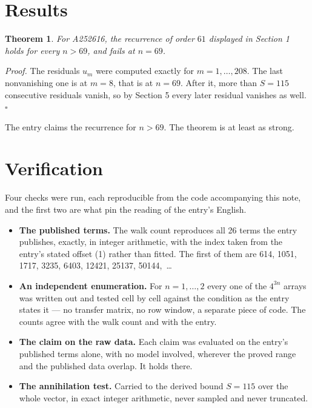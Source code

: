 \documentclass[11pt]{article}
\newtheorem{theorem}{Theorem}
\theoremstyle{definition}
\begin{document}
\section{Results}

\begin{theorem} For A252616, the recurrence of order $61$ displayed in Section 1 holds for every $n > 69$, and fails at $n = 69$.\end{theorem}

{\itshape Proof.} The residuals $u_m$ were computed exactly for $m = 1,\dots,208$. The last nonvanishing one is at $m = 8$, that is at $n = 69$. After it, more than $S = 115$ consecutive residuals vanish, so by Section 5 every later residual vanishes as well. $\square$

The entry claims the recurrence for $n > 69$. The theorem is at least as strong.

\section{Verification}

Four checks were run, each reproducible from the code accompanying this note, and the first two are what pin the reading of the entry's English.

\begin{itemize}

\item {\bfseries The published terms.} The walk count reproduces all 26 terms the entry publishes, exactly, in integer arithmetic, with the index taken from the entry's stated offset (1) rather than fitted. The first of them are 614, 1051, 1717, 3235, 6403, 12421, 25137, 50144,~\dots

\item {\bfseries An independent enumeration.} For $n = 1,\dots,2$ every one of the $4^{3n}$ arrays was written out and tested cell by cell against the condition as the entry states it --- no transfer matrix, no row window, a separate piece of code. The counts agree with the walk count and with the entry.

\item {\bfseries The claim on the raw data.} Each claim was evaluated on the entry's published terms alone, with no model involved, wherever the proved range and the published data overlap. It holds there.

\item {\bfseries The annihilation test.} Carried to the derived bound $S = 115$ over the whole vector, in exact integer arithmetic, never sampled and never truncated.

\end{itemize}
\end{document}
